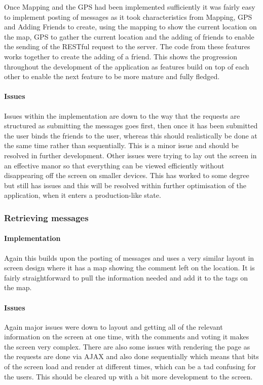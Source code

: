 Once Mapping and the GPS had been implemented sufficiently it was fairly easy to implement posting of messages as it took characteristics from Mapping, GPS and Adding Friends to create, using the mapping to show the current location on the map, GPS to gather the current location and the adding of friends to enable the sending of the RESTful request to the server. The code from these features works together to create the adding of a friend. This shows the progression throughout the development of the application as features build on top of each other to enable the next feature to be more mature and fully fledged.

\paragraph*{Issues}

Issues within the implementation are down to the way that the requests are structured as submitting the messages goes first, then once it has been submitted the user binds the friends to the user, whereas this should realistically be done at the same time rather than sequentially. This is a minor issue and should be resolved in further development. Other issues were trying to lay out the screen in an effective manor so that everything can be viewed efficiently without disappearing off the screen on smaller devices. This has worked to some degree but still has issues and this will be resolved within further optimisation of the application, when it enters a production-like state.

\subsubsection{Retrieving messages}

\paragraph*{Implementation}

Again this builds upon the posting of messages and uses a very similar layout in screen design where it has a map showing the comment left on the location. It is fairly straightforward to pull the information needed and add it to the tags on the map. 

\paragraph*{Issues}

Again major issues were down to layout and getting all of the relevant information on the screen at one time, with the comments and voting it makes the screen very complex. There are also some issues with rendering the page as the requests are done via AJAX and also done sequentially which means that bits of the screen load and render at different times, which can be a tad confusing for the users. This should be cleared up with a bit more development to the screen.

